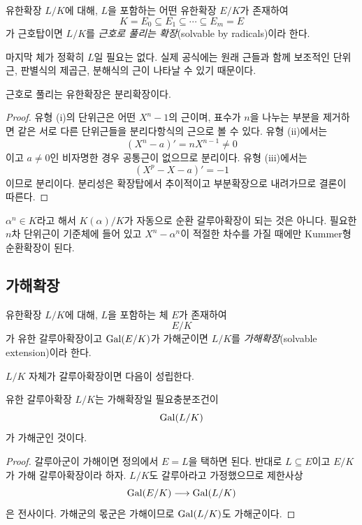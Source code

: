 \begin{definition}
유한확장 $L/K$에 대해, $L$을 포함하는 어떤 유한확장 $E/K$가 존재하여
\[
  K=E_0\subseteq E_1\subseteq\cdots\subseteq E_m=E
\]
가 근호탑이면 $L/K$를 \emph{근호로 풀리는 확장}(solvable by radicals)이라 한다.
\end{definition}

마지막 체가 정확히 $L$일 필요는 없다. 실제 공식에는 원래 근들과 함께 보조적인 단위근, 판별식의 제곱근, 분해식의 근이 나타날 수 있기 때문이다.

\begin{proposition}
근호로 풀리는 유한확장은 분리확장이다.
\end{proposition}

\begin{proof}
유형 (i)의 단위근은 어떤 $X^n-1$의 근이며, 표수가 $n$을 나누는 부분을 제거하면 같은 서로 다른 단위근들을 분리다항식의 근으로 볼 수 있다. 유형 (ii)에서는
\[
  (X^n-a)'=nX^{n-1}\ne0
\]
이고 $a\ne0$인 비자명한 경우 공통근이 없으므로 분리이다. 유형 (iii)에서는
\[
  (X^p-X-a)'=-1
\]
이므로 분리이다. 분리성은 확장탑에서 추이적이고 부분확장으로 내려가므로 결론이 따른다.
\end{proof}

\begin{pitfall}
$\alpha^n\in K$라고 해서 $K(\alpha)/K$가 자동으로 순환 갈루아확장이 되는 것은 아니다. 필요한 $n$차 단위근이 기준체에 들어 있고 $X^n-\alpha^n$이 적절한 차수를 가질 때에만 Kummer형 순환확장이 된다.
\end{pitfall}

\subsection{가해확장}

\begin{definition}[가해확장]
유한확장 $L/K$에 대해, $L$을 포함하는 체 $E$가 존재하여
\[
  E/K
\]
가 유한 갈루아확장이고 $\operatorname{Gal}(E/K)$가 가해군이면 $L/K$를 \emph{가해확장}(solvable extension)이라 한다.
\end{definition}

$L/K$ 자체가 갈루아확장이면 다음이 성립한다.

\begin{proposition}
유한 갈루아확장 $L/K$는 가해확장일 필요충분조건이
\[
  \operatorname{Gal}(L/K)
\]
가 가해군인 것이다.
\end{proposition}

\begin{proof}
갈루아군이 가해이면 정의에서 $E=L$을 택하면 된다. 반대로 $L\subseteq E$이고 $E/K$가 가해 갈루아확장이라 하자. $L/K$도 갈루아라고 가정했으므로 제한사상
\[
  \operatorname{Gal}(E/K)\longrightarrow\operatorname{Gal}(L/K)
\]
은 전사이다. 가해군의 몫군은 가해이므로 $\operatorname{Gal}(L/K)$도 가해군이다.
\end{proof}

